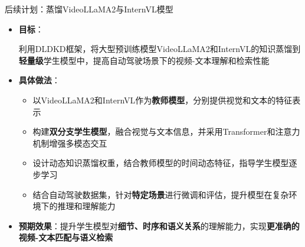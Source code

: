 \documentclass[serif]{beamer}
\begin{document}
\begin{frame}{后续计划：蒸馏VideoLLaMA2与InternVL模型}

\begin{itemize}
  \item \textbf{目标}：
  
  利用DLDKD框架，将大型预训练模型VideoLLaMA2和InternVL的知识蒸馏到\textbf{轻量级}学生模型中，提高自动驾驶场景下的视频-文本理解和检索性能
  \item \textbf{具体做法}：
    \begin{itemize}
      \item 以VideoLLaMA2和InternVL作为\textbf{教师模型}，分别提供视觉和文本的特征表示
      \item 构建\textbf{双分支学生模型}，融合视觉与文本信息，并采用Transformer和注意力机制增强多模态交互
      \item 设计动态知识蒸馏权重，结合教师模型的时间动态特征，指导学生模型逐步学习
      \item 结合自动驾驶数据集，针对\textbf{特定场景}进行微调和评估，提升模型在复杂环境下的推理和理解能力
    \end{itemize}
  \item \textbf{预期效果}：提升学生模型对\textbf{细节、时序和语义关系}的理解能力，实现\textbf{更准确的视频-文本匹配与语义检索}
\end{itemize}

\end{frame}
\end{document}
